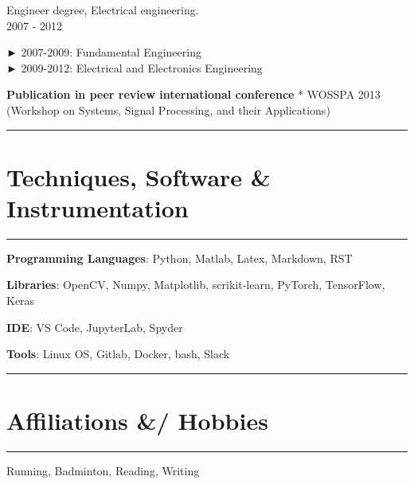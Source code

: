 \documentclass[
]{article}
\begin{document}
Engineer degree, Electrical engineering.\\
2007 - 2012

► 2007-2009: Fundamental Engineering\\
► 2009-2012: Electrical and Electronics Engineering

\textbf{Publication in peer review international conference} * WOSSPA
2013 (Workshop on Systems, Signal Processing, and their Applications)

\begin{center}\rule{0.5\linewidth}{\linethickness}\end{center}

\hypertarget{techniques-software-instrumentation}{%
\section{Techniques, Software \&
Instrumentation}\label{techniques-software-instrumentation}}

\begin{center}\rule{0.5\linewidth}{\linethickness}\end{center}

\textbf{Programming Languages}: Python, Matlab, Latex, Markdown, RST

\textbf{Libraries}: OpenCV, Numpy, Matplotlib, scrikit-learn, PyTorch,
TensorFlow, Keras

\textbf{IDE}: VS Code, JupyterLab, Spyder

\textbf{Tools}: Linux OS, Gitlab, Docker, bash, Slack

\begin{center}\rule{0.5\linewidth}{\linethickness}\end{center}

\hypertarget{affiliations-hobbies}{%
\section{Affiliations \&/ Hobbies}\label{affiliations-hobbies}}

\begin{center}\rule{0.5\linewidth}{\linethickness}\end{center}

Running, Badminton, Reading, Writing
\end{document}

